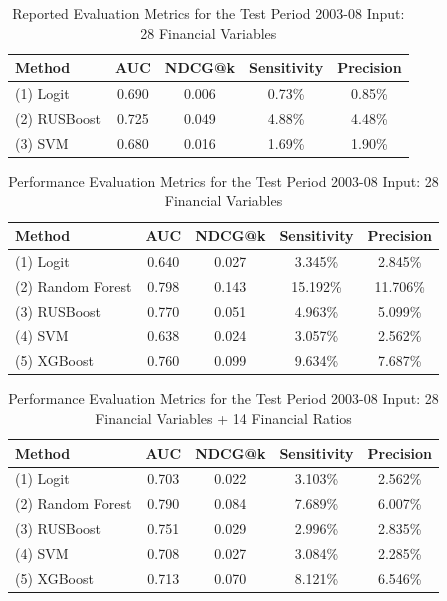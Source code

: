\documentclass[conference]{IEEEtran}
\begin{document}
\begin{table}[H]
\caption{Reported Evaluation Metrics for the Test Period 2003-08 \newline Input: 28 Financial Variables}
\centering
\begin{tabular}{p{2.495cm}cccc}
\toprule
\textbf{Method} & \textbf{AUC} & \textbf{NDCG@k} & \textbf{Sensitivity} & \textbf{Precision} \\
\midrule
\raggedright (1) Logit & 0.690 & 0.006 & 0.73\% & 0.85\% \\
\raggedright (2) RUSBoost & 0.725 & 0.049 & 4.88\% & 4.48\% \\
\raggedright (3) SVM & 0.680 & 0.016 & 1.69\% & 1.90\% \\
\bottomrule
\end{tabular}
\label{tab:performance}
\end{table}


\begin{table}[H]
\caption{Performance Evaluation Metrics for the Test Period 2003-08 \newline Input: 28 Financial Variables}
\centering
\begin{tabular}{p{2.495cm}cccc}
\toprule
\textbf{Method} & \textbf{AUC} & \textbf{NDCG@k} & \textbf{Sensitivity} & \textbf{Precision} \\
\midrule
\raggedright (1) Logit & 0.640 & 0.027 & 3.345\% & 2.845\% \\
\raggedright (2) Random Forest & 0.798 & 0.143 & 15.192\% & 11.706\% \\
\raggedright (3) RUSBoost & 0.770 & 0.051 & 4.963\% & 5.099\% \\
\raggedright (4) SVM & 0.638 & 0.024 & 3.057\% & 2.562\% \\
\raggedright (5) XGBoost & 0.760 & 0.099 & 9.634\% & 7.687\% \\
\bottomrule
\end{tabular}
\label{tab:performance}
\end{table}

\begin{table}[H]
\caption{Performance Evaluation Metrics for the Test Period 2003-08 \newline Input: 28 Financial Variables + 14 Financial Ratios}
\centering
\begin{tabular}{p{2.495cm}cccc}
\toprule
\textbf{Method} & \textbf{AUC} & \textbf{NDCG@k} & \textbf{Sensitivity} & \textbf{Precision} \\
\midrule
\raggedright (1) Logit & 0.703 & 0.022 & 3.103\% & 2.562\% \\
\raggedright (2) Random Forest & 0.790 & 0.084 & 7.689\% & 6.007\% \\
\raggedright (3) RUSBoost & 0.751 & 0.029 & 2.996\% & 2.835\% \\
\raggedright (4) SVM & 0.708 & 0.027 & 3.084\% & 2.285\% \\
\raggedright (5) XGBoost & 0.713 & 0.070 & 8.121\% & 6.546\% \\

\bottomrule
\end{tabular}
\end{table}
\end{document}

